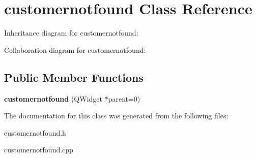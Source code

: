 \section{customernotfound Class Reference}
\label{classcustomernotfound}


Inheritance diagram for customernotfound\+:


Collaboration diagram for customernotfound\+:
\subsection*{Public Member Functions}
\begin{DoxyCompactItemize}
\item 
\mbox{\label{classcustomernotfound_a3fb974f42bf7a492038e0623b38d4102}} 
{\bfseries customernotfound} (Q\+Widget $\ast$parent=0)
\end{DoxyCompactItemize}


The documentation for this class was generated from the following files\+:\begin{DoxyCompactItemize}
\item 
customernotfound.\+h\item 
customernotfound.\+cpp\end{DoxyCompactItemize}
